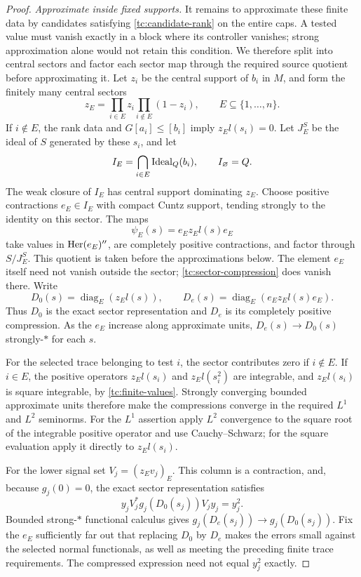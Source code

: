 \begin{proof}
\smallskip\noindent\emph{Approximate inside fixed supports.} 
It remains to approximate these finite data by candidates satisfying
\eqref{tc:candidate-rank} on the entire caps.  A tested value must vanish
exactly in a block where its controller vanishes; strong approximation
alone would not retain this condition.  We therefore split into central
sectors and factor each sector map through the required source quotient
before approximating it.  Let $z_i$ be the central
support of $b_i$ in $M$, and form the finitely many central sectors
\[
 z_E=\prod_{i\in E}z_i\prod_{i\notin E}(1-z_i),
 \qquad E\subseteq\{1,\ldots,n\}.
\]
If $i\notin E$, the rank data and $G[a_i]\leq[b_i]$ imply
$z_El(s_i)=0$.  Let $J_E^S$ be the ideal of $S$ generated by these
$s_i$, and let
\[
 I_E=\bigcap_{i\in E}\operatorname{Ideal}_Q(b_i),
 \qquad I_{\varnothing}=Q.
\]
The weak closure of $I_E$ has central support dominating $z_E$.
Choose positive contractions $e_E\in I_E$ with compact Cuntz support,
tending strongly to the identity on this sector.  The maps
\begin{equation}\label{tc:sector-compression}
 \psi_E(s)=e_Ez_El(s)e_E
\end{equation}
take values in $\operatorname{Her}(e_E)''$, are completely positive contractions,
and factor through $S/J_E^S$.  This quotient is taken before the
approximations below.  The element $e_E$ itself need not vanish outside
the sector; \eqref{tc:sector-compression} does vanish there.
Write
\[
 D_0(s)=\operatorname{diag}_E(z_El(s)),\qquad
 D_e(s)=\operatorname{diag}_E(e_Ez_El(s)e_E).
\]
Thus $D_0$ is the exact sector representation and $D_e$ is its completely
positive compression.  As the $e_E$ increase along approximate units,
$D_e(s)\to D_0(s)$ strongly-$*$ for each $s$.

For the selected trace belonging to test $i$, the sector contributes
zero if $i\notin E$.  If $i\in E$, the positive operators
$z_El(s_i)$ and $z_El(s_i^2)$ are integrable, and $z_El(s_i)$ is square
integrable, by \eqref{tc:finite-values}.  Strongly converging bounded
approximate units therefore make the compressions converge in the
required $L^1$ and $L^2$ seminorms.  For the $L^1$ assertion apply
$L^2$ convergence to the square root of the integrable positive
operator and use Cauchy--Schwarz; for the square evaluation apply it
directly to $z_El(s_i)$.

For the lower signal set $V_j=(z_Ev_j)_E$.  This column is a
contraction, and, because $g_j(0)=0$, the exact sector representation
satisfies
\[
 y_jV_j^*g_j(D_0(s_j))V_jy_j=y_j^2.
\]
Bounded strong-$*$ functional calculus gives
$g_j(D_e(s_j))\to g_j(D_0(s_j))$.  Fix the $e_E$ sufficiently far out
that replacing $D_0$ by $D_e$ makes the errors small against the selected
normal functionals, as well as meeting the preceding finite trace
requirements.  The compressed expression need not equal $y_j^2$ exactly.


\end{proof}
